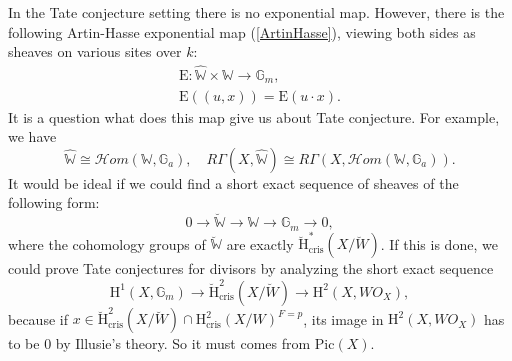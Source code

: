 \documentclass[a4paper,12pt,twoside]{report}
\newcommand{\G}{\mathbb{G}}
\newcommand{\cris}{\mathrm{cris}}
\newcommand{\Pic}{\mathrm{Pic}}
\newcommand{\HH}{\mathrm{H}}
\newcommand{\W}{\mathbb{W}}
\begin{document}
In the Tate conjecture setting there is no exponential map. 
However, there is the following Artin-Hasse exponential map (\ref{ArtinHasse}), viewing both sides as sheaves on various sites over $k$:  
\begin{equation}\begin{aligned}
    \mathrm{E}:\widehat{\W}\times \W\rightarrow \G_m, \\ \label{ArtinHasse}
    \mathrm{E}((u,x))=\mathrm{E}(u\cdot x).
\end{aligned}\end{equation}
It is a question what does this map give us about Tate conjecture. 
For example, we have \[\widehat{\W}\cong \mathcal{H}om(\W,\G_a), \quad
R\Gamma(X,\widehat{\W})\cong R\Gamma(X,\mathcal{H}om(\W,\G_a)).\]
It would be ideal if we could find a short exact sequence of sheaves of the following form: 
\[0\rightarrow \breve{\W} \rightarrow \W \rightarrow \G_m \rightarrow 0, \]
where the cohomology groups of $\breve{\W}$ are exactly $\breve{\HH}^*_{\cris}(X/\breve{W})$. 
If this is done, we could prove Tate conjectures for divisors by analyzing the short exact sequence 
\[\HH^1(X,\G_m)\rightarrow \breve{\HH}^2_{\cris}(X/\breve{W})\rightarrow \HH^2(X,WO_X),\]
because if $x\in \breve{\HH}^2_{\cris}(X/\breve{W})\cap \HH^2_{\cris}(X/W)^{F=p}$, 
its image in $\HH^2(X,WO_X)$ has to be $0$ by Illusie's theory. So it must comes from $\Pic(X)$. 

\appendix
\end{document}
